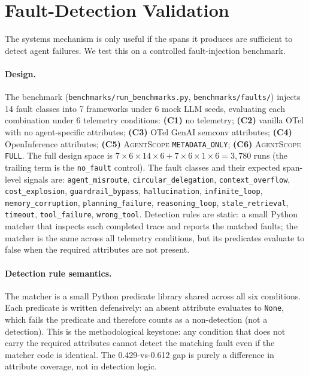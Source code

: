 \documentclass[sigplan,10pt,anonymous,review]{acmart}
\newcommand{\sysname}{\textsc{AgentScope}\xspace}
\begin{document}
\section{Fault-Detection Validation}
\label{sec:fault}

The systems mechanism is only useful if the spans it produces are
sufficient to detect agent failures. We test this on a controlled
fault-injection benchmark.

\paragraph{Design.} The benchmark
(\texttt{benchmarks/run\_benchmarks.py},
\texttt{benchmarks/faults/}) injects 14 fault classes into 7
frameworks under 6 mock LLM seeds, evaluating each combination under 6
telemetry conditions:
\textbf{(C1)} no telemetry; \textbf{(C2)} vanilla OTel with no
agent-specific attributes; \textbf{(C3)} OTel GenAI semconv
attributes; \textbf{(C4)} OpenInference attributes; \textbf{(C5)}
\sysname{} \texttt{METADATA\_ONLY}; \textbf{(C6)} \sysname{}
\texttt{FULL}. The full design space is $7 \times 6 \times 14 \times
6 + 7 \times 6 \times 1 \times 6 = 3{,}780$ runs (the trailing term is
the \texttt{no\_fault} control). The fault classes and their
expected span-level signals are:
\texttt{agent\_misroute}, \texttt{circular\_delegation},
\texttt{context\_overflow}, \texttt{cost\_explosion},
\texttt{guardrail\_bypass}, \texttt{hallucination},
\texttt{infinite\_loop}, \texttt{memory\_corruption},
\texttt{planning\_failure}, \texttt{reasoning\_loop},
\texttt{stale\_retrieval}, \texttt{timeout}, \texttt{tool\_failure},
\texttt{wrong\_tool}. Detection rules are static: a small Python
matcher that inspects each completed trace and reports the matched
faults; the matcher is the same across all telemetry conditions, but
its predicates evaluate to false when the required attributes are not
present.

\paragraph{Detection rule semantics.} The matcher is a small Python
predicate library shared across all six conditions. Each predicate is
written defensively: an absent attribute evaluates to \texttt{None},
which fails the predicate and therefore counts as a non-detection (not
a detection). This is the methodological keystone: any condition that
does not carry the required attributes cannot detect the matching
fault even if the matcher code is identical. The 0.429-vs-0.612 gap is
purely a difference in attribute coverage, not in detection logic.
\end{document}
